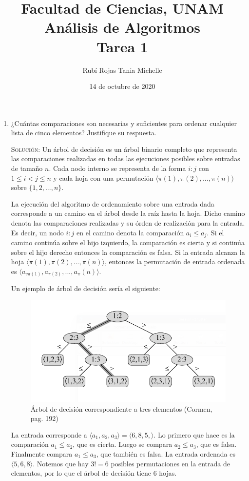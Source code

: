 \documentclass[letterpaper,11pt]{article}
\title{Facultad de Ciencias, UNAM \\ 
       Análisis de Algoritmos \\ 
       Tarea 1}
\author{Rubí Rojas Tania Michelle}
\date{14 de octubre de 2020}
\begin{document}
\maketitle

\begin{enumerate}
    \item ¿Cuántas comparaciones son necesarias y suficientes para ordenar 
    cualquier lista de cinco elementos? Justifique su respuesta.

    \textsc{Solución:} Un árbol de decisión es un árbol binario completo que 
    representa las comparaciones realizadas en todas las ejecuciones posibles 
    sobre entradas de tamaño $n$. Cada nodo interno se representa de la forma 
    $i:j$ con $1 \leq i < j \leq n$ y cada hoja con una permutación 
    $\langle \pi(1), \pi(2), ..., \pi(n) \rangle$ sobre $\{1, 2, ..., n\}$.

    La ejecución del algoritmo de ordenamiento sobre una entrada dada 
    corresponde a un camino en el árbol desde la raíz hasta la hoja. Dicho 
    camino denota las comparaciones realizadas y su órden de realización para 
    la entrada. Es decir, un nodo $i:j$ en el camino denota la comparación 
    $a_i \leq a_j$. Si el camino continúa sobre el hijo izquierdo, la
    comparación es cierta y si continúa sobre el hijo derecho entonces la 
    comparación es falsa. Si la entrada alcanza la hoja $\langle \pi(1), 
    \pi(2), ..., \pi(n) \rangle$, entonces la permutación de entrada ordenada 
    es $\langle a_{v\pi(1)}, a_{\pi(2)}, ..., a_\pi(n) \rangle$.

    Un ejemplo de árbol de decisión sería el siguiente:
    \begin{figure}[h]
        \centering
        \includegraphics[width=0.5\linewidth]{imagenes/decision-tree.png}
        \caption{Árbol de decisión correspondiente a tres elementos (Cormen, 
        pag. 192)}
        \label{fig:decision-tree}
    \end{figure}

    La entrada corresponde a $\langle a_1, a_2, a_3 \rangle = \langle 6, 8, 5, 
    \rangle$. Lo primero que hace es la comparación $a_1 \leq a_2$, que es 
    cierta. Luego se compara $a_2 \leq a_3$, que es falsa. Finalmente compara 
    $a_1 \leq a_3$, que también es falsa. La entrada ordenada es $\langle 5, 6, 
    8 \rangle$. Notemos que hay $3! = 6$ posibles permutaciones en la entrada 
    de elementos, por lo que el árbol de decisión tiene $6$ hojas.


\end{enumerate}
\end{document}
